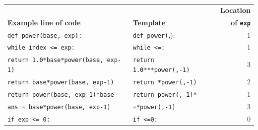 \documentclass[12pt,twoside]{mitthesis}
\begin{document}
\begin{table}
\centering
\begin{tabular}{l l r}
 &  & {\bf Location} \\
{\bf Example line of code} & {\bf Template} & {\bf of \texttt{exp}} \\
\hline
\footnotesize{\texttt{def power(base, exp):}} & \footnotesize{\texttt{def power(\underline{\hspace{1em}}},\underline{\hspace{1em}}):} & 1 \\
\footnotesize{\texttt{while index <= exp:}} & \footnotesize{\texttt{while \underline{\hspace{1em}}<=\underline{\hspace{1em}}:}} & 1 \\
\footnotesize{\texttt{return 1.0*base*power(base, exp-1)}} & \footnotesize{\texttt{return 1.0*\underline{\hspace{1em}}*\underline{\hspace{1em}}*power(\underline{\hspace{1em}},\underline{\hspace{1em}}-1)}} & 3 \\
\footnotesize{\texttt{return base*power(base, exp-1)}} & \footnotesize{\texttt{return \underline{\hspace{1em}}*power(\underline{\hspace{1em}},\underline{\hspace{1em}}-1)}} & 2 \\
\footnotesize{\texttt{return power(base, exp-1)*base}} & \footnotesize{\texttt{return power(\underline{\hspace{1em}},\underline{\hspace{1em}}-1)*\underline{\hspace{1em}}}} & 1 \\
\footnotesize{\texttt{ans = base*power(base, exp-1)}} & \footnotesize{\texttt{\underline{\hspace{1em}}=\underline{\hspace{1em}}*power(\underline{\hspace{1em}},\underline{\hspace{1em}}-1)}} & 3 \\
\footnotesize{\texttt{if exp <= 0:}} & \footnotesize{\texttt{if \underline{\hspace{1em}}<=0:}} & 0 \\

\end{tabular}
\end{table}
\end{document}
